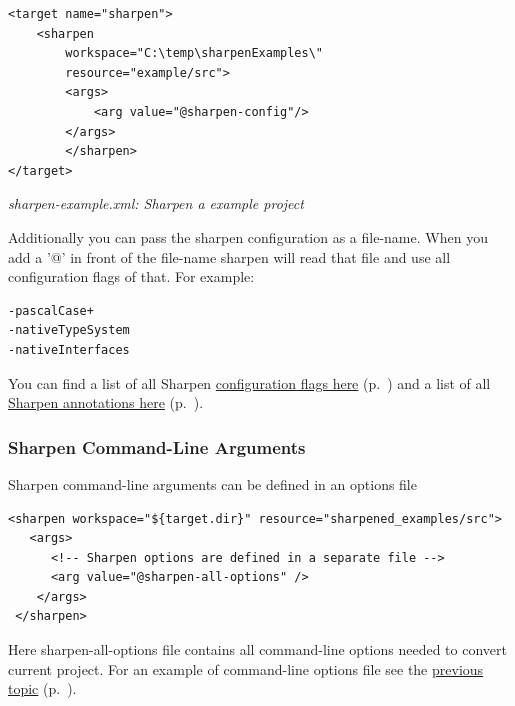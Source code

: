 \begin{lstlisting}
<target name="sharpen">
    <sharpen
        workspace="C:\temp\sharpenExamples\"
        resource="example/src">
        <args>
            <arg value="@sharpen-config"/>
        </args>
        </sharpen>
</target>
\end{lstlisting}

{\small\itshape sharpen-example.xml: Sharpen a example project\par}
\medskip

Additionally you can pass the sharpen configuration as a file-name. When you add a '@' in front of the file-name sharpen will read that file and use all configuration flags of that. For example:

\begin{lstlisting}
-pascalCase+
-nativeTypeSystem
-nativeInterfaces
\end{lstlisting}

You can find a list of all Sharpen \hyperref[ref:community-working-with-source-sharpen-sharpen-command-line-arguments]{configuration flags here} (p.~\pageref{ref:community-working-with-source-sharpen-sharpen-command-line-arguments}) and a list of all \hyperref[ref:community-working-with-source-sharpen-sharpen-annotations]{Sharpen annotations here} (p.~\pageref{ref:community-working-with-source-sharpen-sharpen-annotations}).

\subsubsection{Sharpen Command-Line Arguments}
\label{ref:community-working-with-source-sharpen-sharpen-command-line-arguments}

Sharpen command-line arguments can be defined in an options file

\begin{lstlisting}
<sharpen workspace="${target.dir}" resource="sharpened_examples/src">
   <args>
      <!-- Sharpen options are defined in a separate file -->
      <arg value="@sharpen-all-options" />
    </args>
 </sharpen>      
\end{lstlisting}

Here sharpen-all-options file contains all command-line options needed to convert current project. For an example of command-line options file see the \hyperref[ref:community-working-with-source-sharpen-example-conversion]{previous topic} (p.~\pageref{ref:community-working-with-source-sharpen-example-conversion}).

